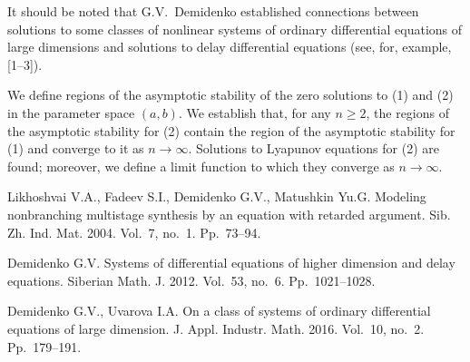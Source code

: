 \documentclass[12pt]{llncs}
\begin{document}
It should be noted that G.V.~Demidenko established connections
between solutions to some classes  of nonlinear systems
of ordinary differential equations of large dimensions and solutions
to delay differential equations (see, for, example, [1--3]).

We define regions of the asymptotic stability of the zero solutions to 
(1) and (2) in the parameter space $(a, b)$. We 
establish that, for any $n \geq 2$, 
the regions of the asymptotic stability for (2) contain 
the region of the asymptotic stability for 
(1) and converge to it as $n \to \infty$. Solutions 
to Lyapunov equations for (2) are found; moreover, we define a limit 
function to which they converge as $n \to \infty$.


\begin{thebibliography}{9} %

Likhoshvai V.A., Fadeev S.I., Demidenko G.V., Matushkin Yu.G.
Modeling nonbranching multistage synthesis by an equation with retarded argument. Sib. Zh. Ind. Mat. 2004. Vol.~7, no.~1. Pp.~73--94.

Demidenko G.V. Systems of differential equations of higher dimension and delay equations. Siberian Math. J. 2012. Vol.~53, no.~6. Pp.~1021--1028.

Demidenko G.V., Uvarova I.A.
On a class of systems of ordinary differential equations of large dimension.
J. Appl. Industr. Math. 2016. Vol.~10, no.~2. Pp.~179--191.

\end{thebibliography}

\end{document}
